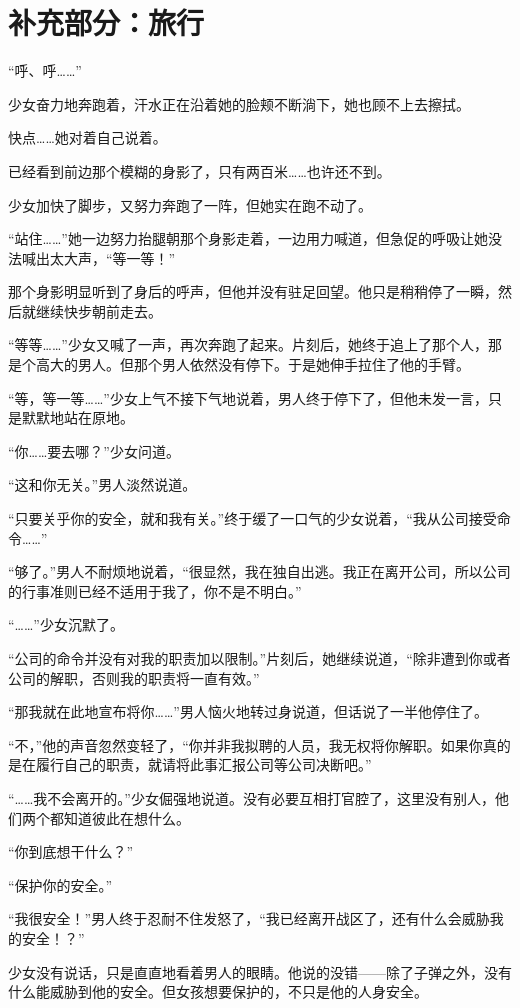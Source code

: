 \specialsectioning{}
\chapter{补充部分：旅行}

“呼、呼……”

少女奋力地奔跑着，汗水正在沿着她的脸颊不断淌下，她也顾不上去擦拭。

快点……她对着自己说着。

已经看到前边那个模糊的身影了，只有两百米……也许还不到。

少女加快了脚步，又努力奔跑了一阵，但她实在跑不动了。

“站住……”她一边努力抬腿朝那个身影走着，一边用力喊道，但急促的呼吸让她没法喊出太大声，“等一等！”

那个身影明显听到了身后的呼声，但他并没有驻足回望。他只是稍稍停了一瞬，然后就继续快步朝前走去。

“等等……”少女又喊了一声，再次奔跑了起来。片刻后，她终于追上了那个人，那是个高大的男人。但那个男人依然没有停下。于是她伸手拉住了他的手臂。

“等，等一等……”少女上气不接下气地说着，男人终于停下了，但他未发一言，只是默默地站在原地。

“你……要去哪？”少女问道。

“这和你无关。”男人淡然说道。

“只要关乎你的安全，就和我有关。”终于缓了一口气的少女说着，“我从公司接受命令……”

“够了。”男人不耐烦地说着，“很显然，我在独自出逃。我正在离开公司，所以公司的行事准则已经不适用于我了，你不是不明白。”

“……”少女沉默了。

“公司的命令并没有对我的职责加以限制。”片刻后，她继续说道，“除非遭到你或者公司的解职，否则我的职责将一直有效。”

“那我就在此地宣布将你……”男人恼火地转过身说道，但话说了一半他停住了。

“不，”他的声音忽然变轻了，“你并非我拟聘的人员，我无权将你解职。如果你真的是在履行自己的职责，就请将此事汇报公司等公司决断吧。”

“……我不会离开的。”少女倔强地说道。没有必要互相打官腔了，这里没有别人，他们两个都知道彼此在想什么。

“你到底想干什么？”

“保护你的安全。”

“我很安全！”男人终于忍耐不住发怒了，“我已经离开战区了，还有什么会威胁我的安全！？”

少女没有说话，只是直直地看着男人的眼睛。他说的没错——除了子弹之外，没有什么能威胁到他的安全。但女孩想要保护的，不只是他的人身安全。

